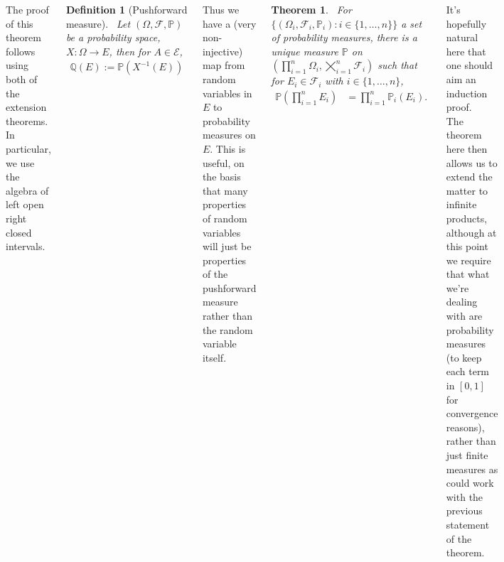 \documentclass{tikzposter} %
\newtheorem{theorem}{Theorem}
\newtheorem{definition}{Definition}
\begin{document}
\begin{columns}
{    The proof of this theorem follows using both of the extension theorems. In particular, we use the algebra of left open right closed intervals. \\

    \begin{definition}[Pushforward measure]
      \ Let $(\Omega, \mathcal{F}, \mathbb{P})$ be a probability space, $X : \Omega \to E$, then for $A \in \mathcal{E}$,
      \begin{align*}
        \mathbb{Q}(E) := \mathbb{P}(X^{-1}(E))
      \end{align*}
    \end{definition}
    \hphantom{}

    Thus we have a (very non-injective) map from random variables in $E$ to probability measures on $E$. This is useful, on the basis that many properties of random variables will just be properties of the pushforward measure rather than the random variable itself. \\

    \begin{theorem}
      \ For $\{(\Omega_{i}, \mathcal{F}_{i}, \mathbb{P}_{i}) : i \in \{1, \dots, n\}\}$ a set of probability measures, there is a unique measure $\mathbb{P}$ on $\displaystyle \left(\prod_{i=1}^{n} \Omega_{i},\bigtimes_{i=1}^{n} \mathcal{F}_{i}\right)$ such that for $E_{i} \in \mathcal{F}_{i}$ with $i \in \{1,\dots,n\}$,
      \begin{align*}
        \mathbb{P}\left(\prod_{i=1}^{n} E_{i}\right) &= \prod_{i=1}^{n} \mathbb{P}_{i}(E_{i}).
      \end{align*}

    \end{theorem}
    \hphantom{}

    It's hopefully natural here that one should aim an induction proof. \\

    The theorem here then allows us to extend the matter to infinite products, although at this point we require that what we're dealing with are probability measures (to keep each term in $[0,1]$ for convergence reasons), rather than just finite measures as could work with the previous statement of the theorem.
  }
\end{columns}
\end{document}
